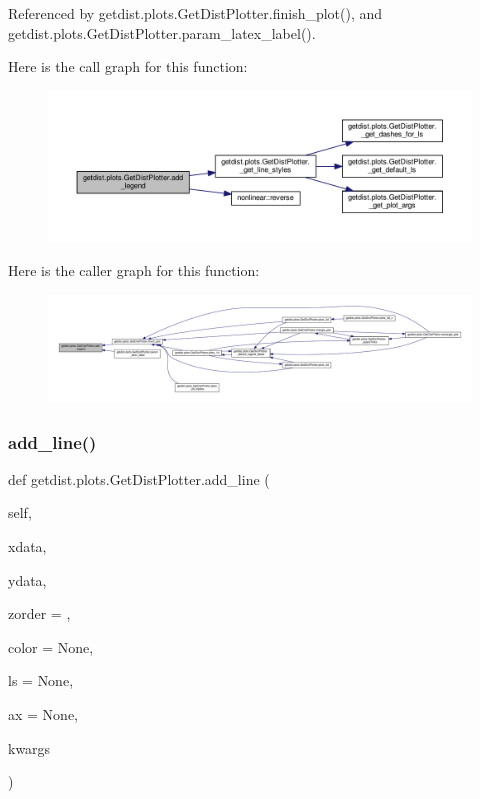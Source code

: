 Referenced by getdist.\+plots.\+Get\+Dist\+Plotter.\+finish\+\_\+plot(), and getdist.\+plots.\+Get\+Dist\+Plotter.\+param\+\_\+latex\+\_\+label().

Here is the call graph for this function\+:
\nopagebreak
\begin{figure}[H]
\begin{center}
\leavevmode
\includegraphics[width=350pt]{classgetdist_1_1plots_1_1GetDistPlotter_ac9e49994c54fdfa9120acddc2c19c352_cgraph}
\end{center}
\end{figure}
Here is the caller graph for this function\+:
\nopagebreak
\begin{figure}[H]
\begin{center}
\leavevmode
\includegraphics[width=350pt]{classgetdist_1_1plots_1_1GetDistPlotter_ac9e49994c54fdfa9120acddc2c19c352_icgraph}
\end{center}
\end{figure}
\mbox{\label{classgetdist_1_1plots_1_1GetDistPlotter_ad52c370b78987bc4e2f67dd242c89e0a}} 
\subsubsection{\texorpdfstring{add\+\_\+line()}{add\_line()}}
{\footnotesize\ttfamily def getdist.\+plots.\+Get\+Dist\+Plotter.\+add\+\_\+line (\begin{DoxyParamCaption}\item[{}]{self,  }\item[{}]{xdata,  }\item[{}]{ydata,  }\item[{}]{zorder = {},  }\item[{}]{color = {\ttfamily None},  }\item[{}]{ls = {\ttfamily None},  }\item[{}]{ax = {\ttfamily None},  }\item[{}]{kwargs }\end{DoxyParamCaption})}

